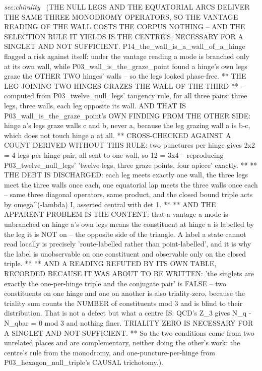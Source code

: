 \begin{description}
\textit{sec:chirality} \ (THE NULL LEGS AND THE EQUATORIAL ARCS DELIVER THE SAME THREE MONODROMY OPERATORS, SO THE VANTAGE READING OF THE WALL COSTS THE CORPUS NOTHING -- AND THE SELECTION RULE IT YIELDS IS THE CENTRE'S, NECESSARY FOR A SINGLET AND NOT SUFFICIENT. P14\_the\_wall\_is\_a\_wall\_of\_a\_hinge flagged a risk against itself: under the vantage reading a mode is branched only at its own wall, while P03\_wall\_is\_the\_graze\_point found a hinge's own legs graze the OTHER TWO hinges' walls -- so the legs looked phase-free. ** THE LEG JOINING TWO HINGES GRAZES THE WALL OF THE THIRD ** -- computed from P03\_twelve\_null\_legs' tangency rule, for all three pairs: three legs, three walls, each leg opposite its wall. AND THAT IS P03\_wall\_is\_the\_graze\_point's OWN FINDING FROM THE OTHER SIDE: hinge a's legs graze walls c and b, never a, because the leg grazing wall a is b-c, which does not touch hinge a at all. ** CROSS-CHECKED AGAINST A COUNT DERIVED WITHOUT THIS RULE: two punctures per hinge gives 2x2 = 4 legs per hinge pair, all sent to one wall, so 12 = 3x4 -- reproducing P03\_twelve\_null\_legs' 'twelve legs, three graze points, four apiece' exactly. ** ** THE DEBT IS DISCHARGED: each leg meets exactly one wall, the three legs meet the three walls once each, one equatorial lap meets the three walls once each -- same three diagonal operators, same product, and the closed bound triple acts by omega\textasciicircum{}(-lambda) I, asserted central with det 1. ** ** AND THE APPARENT PROBLEM IS THE CONTENT: that a vantage-a mode is unbranched on hinge a's own legs means the constituent at hinge a is labelled by the leg it is NOT on -- the opposite side of the triangle. A label a state cannot read locally is precisely 'route-labelled rather than point-labelled', and it is why the label is unobservable on one constituent and observable only on the closed triple. ** ** AND A READING REFUTED BY ITS OWN TABLE, RECORDED BECAUSE IT WAS ABOUT TO BE WRITTEN: 'the singlets are exactly the one-per-hinge triple and the conjugate pair' is FALSE -- two constituents on one hinge and one on another is also triality-zero, because the triality sum counts the NUMBER of constituents mod 3 and is blind to their distribution. That is not a defect but what a centre IS: QCD's Z\_3 gives N\_q - N\_qbar = 0 mod 3 and nothing finer. TRIALITY ZERO IS NECESSARY FOR A SINGLET AND NOT SUFFICIENT. ** So the two conditions come from two unrelated places and are complementary, neither doing the other's work: the centre's rule from the monodromy, and one-puncture-per-hinge from P03\_hexagon\_null\_triple's CAUSAL trichotomy.). 

\end{description}
